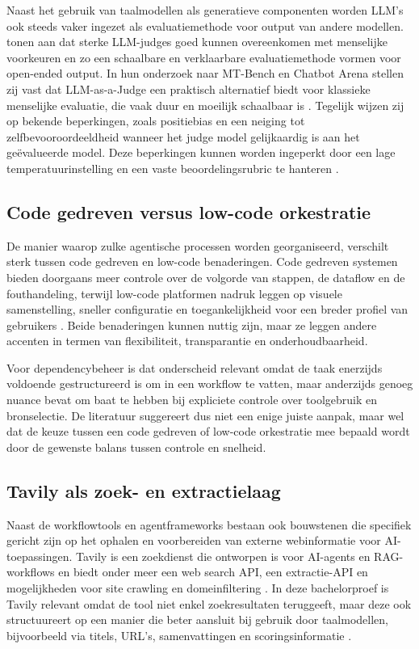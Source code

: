 Naast het gebruik van taalmodellen als generatieve componenten worden LLM's ook steeds vaker ingezet als evaluatiemethode voor output van andere modellen. \textcite{Zheng2023} tonen aan dat sterke LLM-judges goed kunnen overeenkomen met menselijke voorkeuren en zo een schaalbare en verklaarbare evaluatiemethode vormen voor open-ended output. In hun onderzoek naar MT-Bench en Chatbot Arena stellen zij vast dat LLM-as-a-Judge een praktisch alternatief biedt voor klassieke menselijke evaluatie, die vaak duur en moeilijk schaalbaar is \autocite{Zheng2023}. Tegelijk wijzen zij op bekende beperkingen, zoals positiebias en een neiging tot zelfbevooroordeeldheid wanneer het judge model gelijkaardig is aan het geëvalueerde model. Deze beperkingen kunnen worden ingeperkt door een lage temperatuurinstelling en een vaste beoordelingsrubric te hanteren \autocite{Zheng2023}.

\subsection{Code gedreven versus low-code orkestratie}

De manier waarop zulke agentische processen worden georganiseerd, verschilt sterk tussen code gedreven en low-code benaderingen. Code gedreven systemen bieden doorgaans meer controle over de volgorde van stappen, de dataflow en de fouthandeling, terwijl low-code platformen nadruk leggen op visuele samenstelling, sneller configuratie en toegankelijkheid voor een breder profiel van gebruikers \textcite{Wali2025}. Beide benaderingen kunnen nuttig zijn, maar ze leggen andere accenten in termen van flexibiliteit, transparantie en onderhoudbaarheid.

Voor dependencybeheer is dat onderscheid relevant omdat de taak enerzijds voldoende gestructureerd is om in een workflow te vatten, maar anderzijds genoeg nuance bevat om baat te hebben bij expliciete controle over toolgebruik en bronselectie. De literatuur suggereert dus niet een enige juiste aanpak, maar wel dat de keuze tussen een code gedreven of low-code orkestratie mee bepaald wordt door de gewenste balans tussen controle en snelheid.

\subsection{Tavily als zoek- en extractielaag}

Naast de workflowtools en agentframeworks bestaan ook bouwstenen die specifiek gericht zijn op het ophalen en voorbereiden van externe webinformatie voor AI-toepassingen. Tavily is een zoekdienst die ontworpen is voor AI-agents en RAG-workflows en biedt onder meer een web search API, een extractie-API en mogelijkheden voor site crawling en domeinfiltering \textcite{TavilyDocs2026,TavilyIntro2026}. In deze bachelorproef is Tavily relevant omdat de tool niet enkel zoekresultaten teruggeeft, maar deze ook structuureert op een manier die beter aansluit bij gebruik door taalmodellen, bijvoorbeeld via titels, URL's, samenvattingen en scoringsinformatie \textcite{TavilyDocs2026,TavilyAI2026}.

